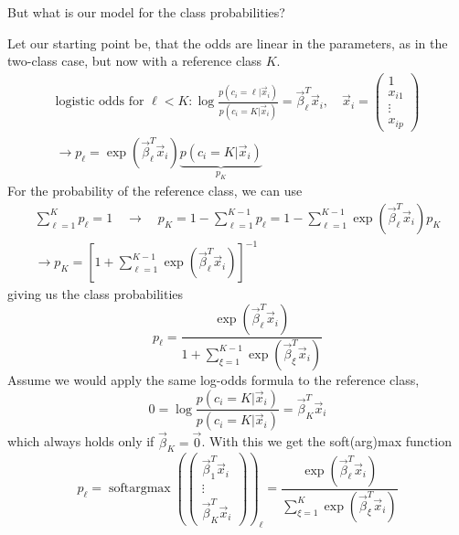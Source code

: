 
But what is our model for the class probabilities?

Let our starting point be, that the odds are linear in the parameters,
as in the two-class case, but now with a reference class $K$.
\begin{equation}
    \begin{gathered}
        \text{logistic odds for } \ell<K: \log \frac{p(c_i = \ell | \vec{x}_i)}{p(c_i = K | \vec{x}_i)} = \vec{\beta}_\ell^T \vec{x}_i, \quad \vec{x}_i = \begin{pmatrix}
            1 \\ x_{i1} \\ \vdots \\ x_{ip}
        \end{pmatrix} \\
        \rightarrow p_\ell = \exp(\vec{\beta}_\ell^T \vec{x}_i) \underbrace{p(c_i = K | \vec{x}_i)}_{p_K}
    \end{gathered}
\end{equation}
For the probability of the reference class, we can use
\begin{equation}
    \begin{gathered}
    \sum_{\ell=1}^{K} p_\ell = 1 \quad \rightarrow \quad p_K = 1 - \sum_{\ell=1}^{K-1} p_\ell = 1 - \sum_{\ell=1}^{K-1} \exp(\vec{\beta}_\ell^T \vec{x}_i) p_K \\
    \rightarrow p_K = \left[ 1 + \sum_{\ell=1}^{K-1} \exp(\vec{\beta}_\ell^T \vec{x}_i) \right]^{-1}
    \end{gathered}
\end{equation}
giving us the class probabilities
\begin{equation}
    p_\ell = \frac{\exp(\vec{\beta}_\ell^T \vec{x}_i)}{1 + \sum_{\xi=1}^{K-1} \exp(\vec{\beta}_\xi^T \vec{x}_i)}
\end{equation}
Assume we would apply the same log-odds formula to the reference class,
\begin{equation}
    0 = \log \frac{p(c_i = K | \vec{x}_i)}{p(c_i = K | \vec{x}_i)} = \vec{\beta}_K^T \vec{x}_i
\end{equation}
which always holds only if $\vec{\beta}_K = \vec{0}$. With this we get the
soft(arg)max function
\begin{equation}
    p_\ell = \operatorname{softargmax}\left( \begin{pmatrix}
        \vec{\beta}_1^T \vec{x}_i \\ \vdots \\ \vec{\beta}_{K}^T \vec{x}_i
    \end{pmatrix} \right)_\ell = \frac{\exp(\vec{\beta}_\ell^T \vec{x}_i)}{\sum_{\xi=1}^{K} \exp(\vec{\beta}_\xi^T \vec{x}_i)}
\end{equation}

